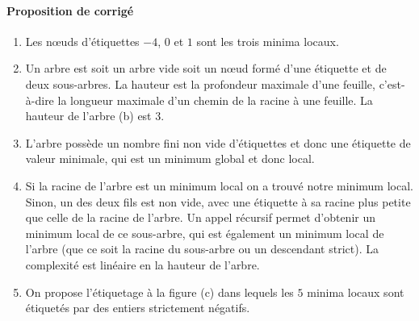 \documentclass[a4paper, 11pt]{article}
\begin{document}
\paragraph{Proposition de corrigé}

\begin{enumerate}
\item Les n\oe{}uds d'étiquettes $-4$, $0$ et $1$ sont les
  trois minima locaux.
\item Un arbre est soit un arbre vide soit un n\oe{}ud formé
  d'une étiquette et de deux sous-arbres. La hauteur est la profondeur
  maximale d'une feuille, c'est-à-dire la longueur maximale d'un
  chemin de la racine à une feuille. La hauteur de l'arbre (b) est
  $3$.
\item L'arbre possède un nombre fini non vide d'étiquettes et donc une
  étiquette de valeur minimale, qui est un minimum global et donc
  local.
\item Si la racine de l'arbre est un minimum local on a trouvé
  notre minimum local. Sinon, un des deux fils est non vide, avec une
  étiquette à sa racine plus petite que celle de la racine de l'arbre.
  Un appel récursif permet d'obtenir un minimum local de ce
  sous-arbre, qui est également un minimum local de l'arbre (que ce
  soit la racine du sous-arbre ou un descendant strict). La complexité
  est linéaire en la hauteur de l'arbre.
\item On propose l'étiquetage à la figure (c) dans lequels
  les $5$ minima locaux sont étiquetés par des entiers strictement
  négatifs.
\end{enumerate}
\begin{figure}[h!]
\centering
{}
\end{figure}
\end{document}
